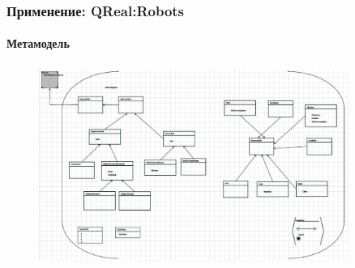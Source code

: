 \documentclass[14pt]{beamer}
\begin{document}
\begin{frame}
\begin{columns}[onlytextwidth]
\begin{column}{0.5\textwidth}
\begin{figure}
\begin{center}
            	\end{center}
            \end{figure}
        \end{column}
    \end{columns}
\end{frame}

\begin{frame}
    \frametitle{Применение: QReal:Robots}
    \framesubtitle{Метамодель}
    \begin{figure}
        \begin{center}
        	\includegraphics[width=0.9\textwidth]{images/presentation/robotsMetamodel.png}
        \end{center}
    \end{figure}
\end{frame}
\end{document}
